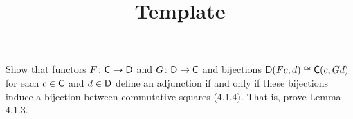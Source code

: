 \documentclass[../../solutions]{subfiles}
\title{Template}
\author{}
\begin{document}
\maketitle

%   

\begin{exercise}
  Show that functors ${F}\colon{{\mathsf{C}}}\to{{\mathsf{D}}}$ and ${G}\colon{{\mathsf{D}}}\to{{\mathsf{C}}}$ and
  bijections ${\mathsf{D}}(Fc, d) \cong {\mathsf{C}}(c, Gd)$ for each $c \in {\mathsf{C}}$ and
  $d \in {\mathsf{D}}$ define an adjunction if and only if these bijections
  induce a bijection between commutative squares (4.1.4). That is,
  prove Lemma 4.1.3.
\end{exercise}
\end{document}

